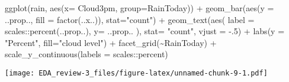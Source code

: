 \documentclass[
]{article}
\newenvironment{Shaded}{\begin{snugshade}}{\end{snugshade}}
\newcommand{\AttributeTok}[1]{\textcolor[rgb]{0.77,0.63,0.00}{#1}}
\newcommand{\DecValTok}[1]{\textcolor[rgb]{0.00,0.00,0.81}{#1}}
\newcommand{\FunctionTok}[1]{\textcolor[rgb]{0.00,0.00,0.00}{#1}}
\newcommand{\NormalTok}[1]{#1}
\newcommand{\SpecialCharTok}[1]{\textcolor[rgb]{0.00,0.00,0.00}{#1}}
\newcommand{\StringTok}[1]{\textcolor[rgb]{0.31,0.60,0.02}{#1}}
\begin{document}
\begin{Shaded}
\begin{Highlighting}[]
\FunctionTok{ggplot}\NormalTok{(rain, }\FunctionTok{aes}\NormalTok{(}\AttributeTok{x=}\NormalTok{ Cloud3pm,  }\AttributeTok{group=}\NormalTok{RainToday)) }\SpecialCharTok{+} 
    \FunctionTok{geom\_bar}\NormalTok{(}\FunctionTok{aes}\NormalTok{(}\AttributeTok{y =}\NormalTok{ ..prop.., }\AttributeTok{fill =} \FunctionTok{factor}\NormalTok{(..x..)), }\AttributeTok{stat=}\StringTok{"count"}\NormalTok{) }\SpecialCharTok{+}
    \FunctionTok{geom\_text}\NormalTok{(}\FunctionTok{aes}\NormalTok{( }\AttributeTok{label =}\NormalTok{ scales}\SpecialCharTok{::}\FunctionTok{percent}\NormalTok{(..prop..),}
                   \AttributeTok{y=}\NormalTok{ ..prop.. ), }\AttributeTok{stat=} \StringTok{"count"}\NormalTok{, }\AttributeTok{vjust =} \SpecialCharTok{{-}}\NormalTok{.}\DecValTok{5}\NormalTok{) }\SpecialCharTok{+}
    \FunctionTok{labs}\NormalTok{(}\AttributeTok{y =} \StringTok{"Percent"}\NormalTok{, }\AttributeTok{fill=}\StringTok{"cloud level"}\NormalTok{) }\SpecialCharTok{+}
    \FunctionTok{facet\_grid}\NormalTok{(}\SpecialCharTok{\textasciitilde{}}\NormalTok{RainToday) }\SpecialCharTok{+}
    \FunctionTok{scale\_y\_continuous}\NormalTok{(}\AttributeTok{labels =}\NormalTok{ scales}\SpecialCharTok{::}\NormalTok{percent)}
\end{Highlighting}
\end{Shaded}

\texttt{[image: EDA\_review-3\_files/figure-latex/unnamed-chunk-9-1.pdf]}
\end{document}
